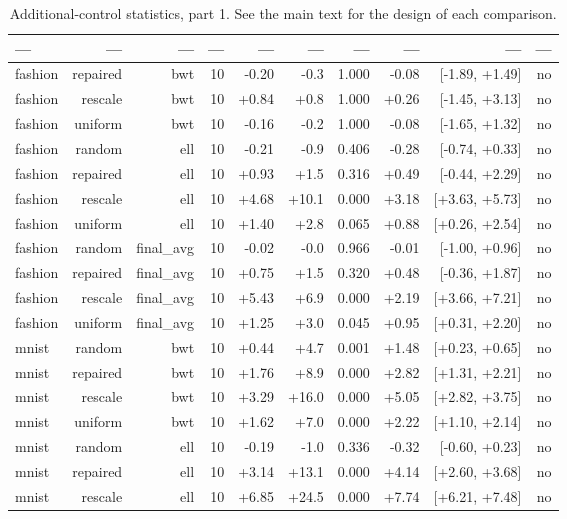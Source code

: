 \documentclass[10pt]{article}
\begin{document}
\begin{table}[h]
\centering\scriptsize
\caption{Additional-control statistics, part 1. See the main text for the design of each comparison.}
\label{tab:sup-s5-1}
\begin{tabular}{lrrrrrrrrr}
\toprule
--- & --- & --- & --- & --- & --- & --- & --- & --- & --- \\
\midrule
fashion & repaired & bwt & 10 & -0.20 & -0.3 & 1.000 & -0.08 & [-1.89, +1.49] & no \\
fashion & rescale & bwt & 10 & +0.84 & +0.8 & 1.000 & +0.26 & [-1.45, +3.13] & no \\
fashion & uniform & bwt & 10 & -0.16 & -0.2 & 1.000 & -0.08 & [-1.65, +1.32] & no \\
fashion & random & ell & 10 & -0.21 & -0.9 & 0.406 & -0.28 & [-0.74, +0.33] & no \\
fashion & repaired & ell & 10 & +0.93 & +1.5 & 0.316 & +0.49 & [-0.44, +2.29] & no \\
fashion & rescale & ell & 10 & +4.68 & +10.1 & 0.000 & +3.18 & [+3.63, +5.73] & no \\
fashion & uniform & ell & 10 & +1.40 & +2.8 & 0.065 & +0.88 & [+0.26, +2.54] & no \\
fashion & random & final\_avg & 10 & -0.02 & -0.0 & 0.966 & -0.01 & [-1.00, +0.96] & no \\
fashion & repaired & final\_avg & 10 & +0.75 & +1.5 & 0.320 & +0.48 & [-0.36, +1.87] & no \\
fashion & rescale & final\_avg & 10 & +5.43 & +6.9 & 0.000 & +2.19 & [+3.66, +7.21] & no \\
fashion & uniform & final\_avg & 10 & +1.25 & +3.0 & 0.045 & +0.95 & [+0.31, +2.20] & no \\
mnist & random & bwt & 10 & +0.44 & +4.7 & 0.001 & +1.48 & [+0.23, +0.65] & no \\
mnist & repaired & bwt & 10 & +1.76 & +8.9 & 0.000 & +2.82 & [+1.31, +2.21] & no \\
mnist & rescale & bwt & 10 & +3.29 & +16.0 & 0.000 & +5.05 & [+2.82, +3.75] & no \\
mnist & uniform & bwt & 10 & +1.62 & +7.0 & 0.000 & +2.22 & [+1.10, +2.14] & no \\
mnist & random & ell & 10 & -0.19 & -1.0 & 0.336 & -0.32 & [-0.60, +0.23] & no \\
mnist & repaired & ell & 10 & +3.14 & +13.1 & 0.000 & +4.14 & [+2.60, +3.68] & no \\
mnist & rescale & ell & 10 & +6.85 & +24.5 & 0.000 & +7.74 & [+6.21, +7.48] & no \\

\end{tabular}
\end{table}
\end{document}
